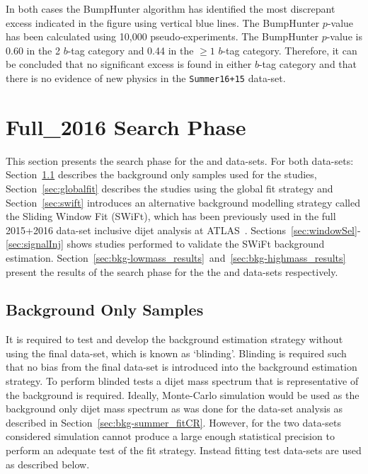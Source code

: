 In both cases the BumpHunter algorithm has identified the most discrepant excess indicated
in the figure using vertical blue lines.
The BumpHunter $p$-value has been calculated using 10,000 pseudo-experiments.
The BumpHunter $p$-value is 0.60 in the 2 $b$-tag category
and 0.44 in the $\geq1$ $b$-tag category.
Therefore, it can be concluded that no significant excess is found in either $b$-tag category
and that there is no evidence of new physics in the \verb|Summer16+15| data-set.

\section{Full\_2016 Search Phase}
\label{sec:bkg-full}

This section presents the search phase for the \hm{} and \lm{} data-sets.
For both data-sets:
Section~\ref{sec:stat:bkgsample} describes the background only samples used for the studies,
Section~\ref{sec:globalfit} describes the studies using the global fit strategy and
Section~\ref{sec:swift} introduces an alternative background modelling strategy called the Sliding Window Fit (SWiFt),
which has been previously used in the full 2015+2016 data-set inclusive dijet analysis at ATLAS~\cite{dijet_mori17_paper}.
Sections~\ref{sec:windowSel}-\ref{sec:signalInj} shows studies performed to validate the SWiFt background estimation.
Section~\ref{sec:bkg-lowmass_results}~and~\ref{sec:bkg-highmass_results} present the results of the search phase
for the the \hm{} and \lm{} data-sets respectively.

\subsection{Background Only Samples}
\label{sec:stat:bkgsample}

It is required to test and develop the background estimation strategy without using the final data-set, which is known as `blinding'.
Blinding is required such that no bias from the final data-set is introduced into the background estimation strategy.
To perform blinded tests a dijet mass spectrum that is representative of the background is required.
Ideally, Monte-Carlo simulation would be used as the background only dijet mass spectrum
as was done for the \summer{} data-set analysis as described in Section~\ref{sec:bkg-summer_fitCR}.
However, for the two data-sets considered simulation cannot produce a large enough statistical precision to perform an adequate test of the fit strategy.
Instead fitting test data-sets are used as described below.

